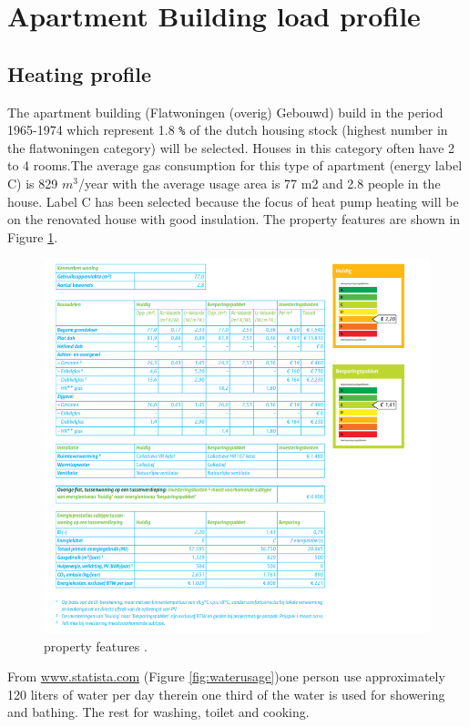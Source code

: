 \section{Apartment Building load profile}
\subsection{Heating profile}

The apartment building (Flatwoningen (overig) Gebouwd) build in the period 1965-1974 which represent 1.8 \texttt{\%} of the dutch housing stock \cite{VOORBEELD} (highest number in the flatwoningen category) will be selected. Houses in this category often have 2 to 4 rooms.The average gas consumption for this type of apartment (energy label C) is 829 $m^3$/year with the average usage area is 77 m2 and 2.8 people in the house. Label C has been selected because the focus of heat pump heating will be on the renovated house with good insulation. The property features are shown in Figure \ref{fig:features}.

\begin{figure}[H]
\centering
\includegraphics[width=1\columnwidth]{pictures/property features.png}
\caption[Short title]{property features \cite{VOORBEELD}.}
\label{fig:features}
\end{figure}

From \url{www.statista.com} (Figure \ref{fig:waterusage})one person use approximately 120 liters of water per day therein one third of the water is used for showering and bathing. The rest for washing, toilet and cooking.

